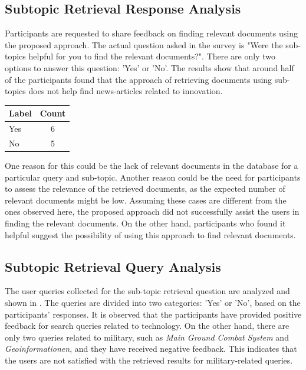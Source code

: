 \subsection{Subtopic Retrieval Response Analysis}

Participants are requested to share feedback on finding relevant documents using the proposed approach. The actual question asked in the survey is "Were the sub-topics helpful for you to find the relevant documents?". There are only two options to answer this question: 'Yes' or 'No'. The results show that around half of the participants found that the approach of retrieving documents using sub-topics does not help find news-articles related to innovation.



\begin{center}
	\label{tab:question_5_results}
	\begin{tabularx}{.3\textwidth}{|Y|c|}
		\hline
		Label & Count \\
		\hline
		Yes & 6 \\
		\hline
		No & 5 \\
		\hline
	\end{tabularx}
\end{center} 

One reason for this could be the lack of relevant documents in the database for a particular query and sub-topic. Another reason could be the need for participants to assess the relevance of the retrieved documents, as the expected number of relevant documents might be low. Assuming these cases are different from the ones observed here, the proposed approach did not successfully assist the users in finding the relevant documents. On the other hand, participants who found it helpful suggest the possibility of using this approach to find relevant documents.

\subsection{Subtopic Retrieval Query Analysis}

The user queries collected for the sub-topic retrieval question are analyzed and shown in . The queries are divided into two categories: 'Yes' or 'No', based on the participants' responses. It is observed that the participants have provided positive feedback for search queries related to technology. On the other hand, there are only two queries related to military, such as \emph{Main Ground Combat System} and \emph{Geoinformationen}, and they have received negative feedback. This indicates that the users are not satisfied with the retrieved results for military-related queries.

